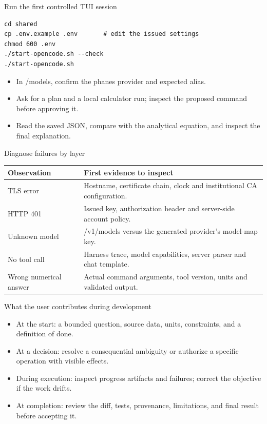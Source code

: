 \documentclass[aspectratio=169,11pt]{beamer}
\begin{document}
\begin{frame}[t,fragile]{Run the first controlled TUI session}
\begin{lstlisting}
cd shared
cp .env.example .env       # edit the issued settings
chmod 600 .env
./start-opencode.sh --check
./start-opencode.sh
\end{lstlisting}
\fontsize{10.5}{12.5}\selectfont
\begin{itemize}\setlength{\itemsep}{2mm}
\item In /models, confirm the phanes provider and expected alias.
\item Ask for a plan and a local calculator run; inspect the proposed command before approving it.
\item Read the saved JSON, compare with the analytical equation, and inspect the final explanation.
\end{itemize}
\end{frame}
\begin{frame}[t,fragile]{Diagnose failures by layer}
\fontsize{10.5}{12.5}\selectfont\setlength{\tabcolsep}{4pt}\renewcommand{\arraystretch}{1.15}
\begin{tabular}{>{\raggedright\arraybackslash}p{}>{\raggedright\arraybackslash}p{}}
\toprule
\textbf{Observation} & \textbf{First evidence to inspect} \\ \midrule
TLS error & Hostname, certificate chain, clock and institutional CA configuration. \\[2pt]
HTTP 401 & Issued key, authorization header and server-side account policy. \\[2pt]
Unknown model & /v1/models versus the generated provider's model-map key. \\[2pt]
No tool call & Harness trace, model capabilities, server parser and chat template. \\[2pt]
Wrong numerical answer & Actual command arguments, tool version, units and validated output. \\[2pt]
\bottomrule\end{tabular}\par\vspace{2mm}
\end{frame}
\begin{frame}[t,fragile]{What the user contributes during development}
\fontsize{11.5}{14}\selectfont
\begin{itemize}\setlength{\itemsep}{2mm}
\item At the start: a bounded question, source data, units, constraints, and a definition of done.
\item At a decision: resolve a consequential ambiguity or authorize a specific operation with visible effects.
\item During execution: inspect progress artifacts and failures; correct the objective if the work drifts.
\item At completion: review the diff, tests, provenance, limitations, and final result before accepting it.
\end{itemize}
\end{frame}
\end{document}
